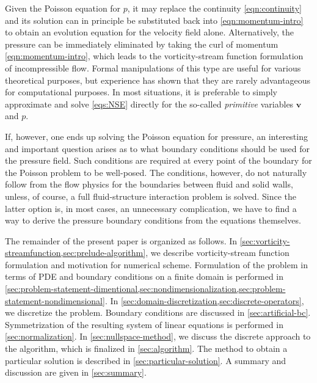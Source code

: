\documentclass{article}
\numberwithin{equation}{section}
\begin{document}
Given the Poisson equation for $p$, it may replace the continuity \cref{eqn:continuity} and its solution can in principle be substituted back into \cref{eqn:momentum-intro} to obtain an evolution equation for the velocity field alone. Alternatively, the pressure can be immediately eliminated by taking the $\mathrm{curl}$ of momentum \cref{eqn:momentum-intro}, which leads to the vorticity-stream function formulation of incompressible flow. Formal manipulations of this type are useful for various theoretical purposes, but experience has shown that they are rarely advantageous for computational purposes. In most situations, it is preferable to simply approximate and solve \cref{eqs:NSE} directly for the so-called \textit{primitive} variables $\boldsymbol{v}$ and $p$.

If, however, one ends up solving the Poisson equation for pressure, an interesting and important question arises as to what boundary conditions should be used for the pressure field. Such conditions are required at every point of the boundary for the Poisson problem to be well-posed. The conditions, however, do not naturally follow from the flow physics for the boundaries between fluid and solid walls, unless, of course, a full fluid-structure interaction problem is solved. Since the latter option is, in most cases, an unnecessary complication, we have to find a way to derive the pressure boundary conditions from the equations themselves.

The remainder of the present paper is organized as follows. 
	In \cref{sec:vorticity-streamfunction,sec:prelude-algorithm}, we describe vorticity-stream function formulation and motivation for numerical scheme. 
	Formulation of the problem in terms of PDE and boundary conditions on a finite domain is performed in \cref{sec:problem-statement-dimentional,sec:nondimensionalization,sec:problem-statement-nondimensional}. 
	In \cref{sec:domain-discretization,sec:discrete-operators}, we discretize the problem. 
	Boundary conditions are discussed in \cref{sec:artificial-bc}. 
	Symmetrization of the resulting system of linear equations is performed in \cref{sec:normalization}.
	In \cref{sec:nullspace-method}, we discuss the discrete approach to the algorithm, which is finalized in \cref{sec:algorithm}. 
	The method to obtain a particular solution is described in \cref{sec:particular-solution}.
	A summary and discussion are given in \cref{sec:summary}.
	
\end{document}
